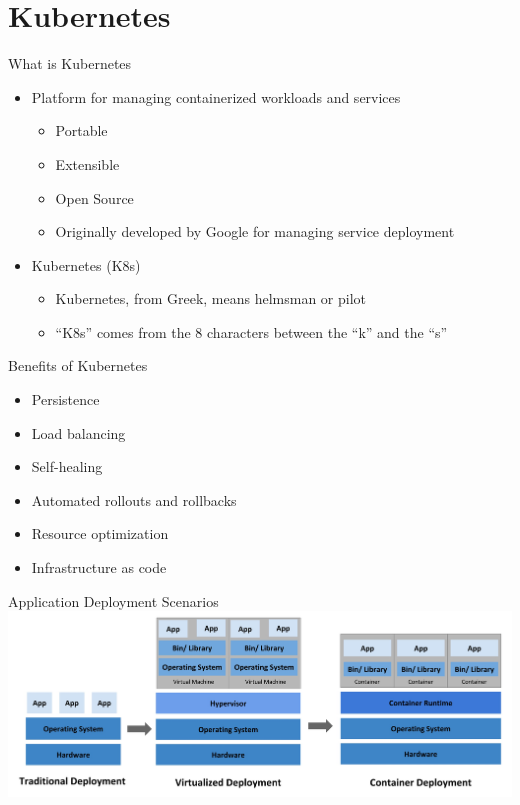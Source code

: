 \section{Kubernetes}

\begin{frame}{What is Kubernetes}
\begin{itemize}
\item Platform for managing containerized workloads and services
\begin{itemize}
\item Portable
\item Extensible
\item Open Source
\item Originally developed by Google for managing service deployment
\end{itemize}
\item Kubernetes (K8s)
\begin{itemize}
\item Kubernetes, from Greek, means helmsman or pilot
\item ``K8s'' comes from the 8 characters between the ``k'' and the ``s''
\end{itemize}
\end{itemize}
\end{frame}

\begin{frame}{Benefits of Kubernetes}
\begin{itemize}
\item Persistence
\item Load balancing
\item Self-healing
\item Automated rollouts and rollbacks
\item Resource optimization
\item Infrastructure as code
\end{itemize}
\end{frame}

\begin{frame}{Application Deployment Scenarios}
\centering
\includegraphics[height=0.7\textheight]{images/deployment_types.jpg}
\end{frame}


